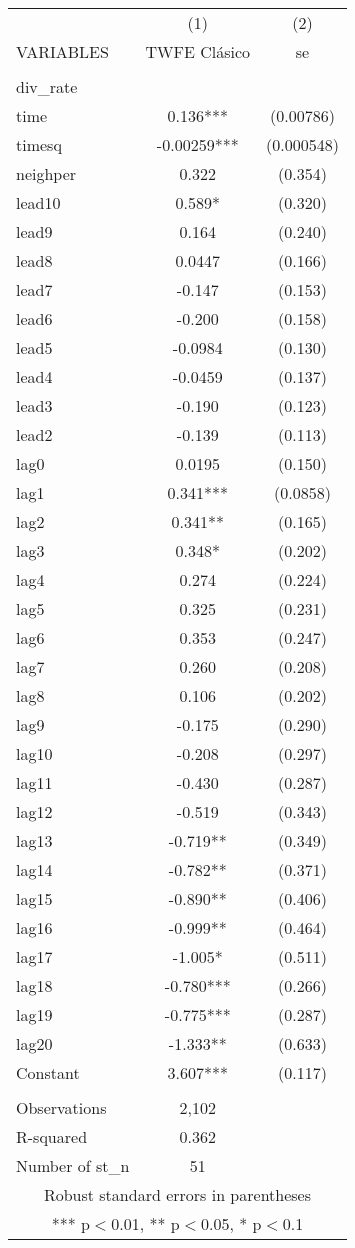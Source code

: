 \begin{tabular}{lcc} \hline
 & (1) & (2) \\
VARIABLES & TWFE Clásico & se \\ \hline
 &  &  \\
div\_rate &  &  \\
time & 0.136*** & (0.00786) \\
timesq & -0.00259*** & (0.000548) \\
neighper & 0.322 & (0.354) \\
lead10 & 0.589* & (0.320) \\
lead9 & 0.164 & (0.240) \\
lead8 & 0.0447 & (0.166) \\
lead7 & -0.147 & (0.153) \\
lead6 & -0.200 & (0.158) \\
lead5 & -0.0984 & (0.130) \\
lead4 & -0.0459 & (0.137) \\
lead3 & -0.190 & (0.123) \\
lead2 & -0.139 & (0.113) \\
lag0 & 0.0195 & (0.150) \\
lag1 & 0.341*** & (0.0858) \\
lag2 & 0.341** & (0.165) \\
lag3 & 0.348* & (0.202) \\
lag4 & 0.274 & (0.224) \\
lag5 & 0.325 & (0.231) \\
lag6 & 0.353 & (0.247) \\
lag7 & 0.260 & (0.208) \\
lag8 & 0.106 & (0.202) \\
lag9 & -0.175 & (0.290) \\
lag10 & -0.208 & (0.297) \\
lag11 & -0.430 & (0.287) \\
lag12 & -0.519 & (0.343) \\
lag13 & -0.719** & (0.349) \\
lag14 & -0.782** & (0.371) \\
lag15 & -0.890** & (0.406) \\
lag16 & -0.999** & (0.464) \\
lag17 & -1.005* & (0.511) \\
lag18 & -0.780*** & (0.266) \\
lag19 & -0.775*** & (0.287) \\
lag20 & -1.333** & (0.633) \\
Constant & 3.607*** & (0.117) \\
 &  &  \\
Observations & 2,102 &  \\
R-squared & 0.362 &  \\
 Number of st\_n & 51 &  \\ \hline
\multicolumn{3}{c}{ Robust standard errors in parentheses} \\
\multicolumn{3}{c}{ *** p$<$0.01, ** p$<$0.05, * p$<$0.1} \\
\end{tabular}

